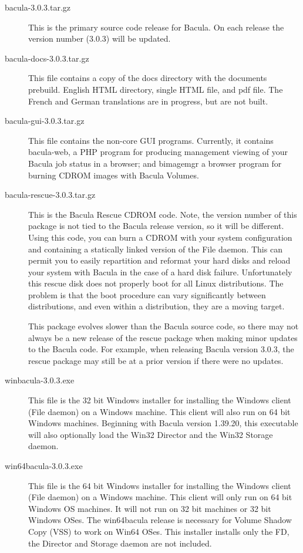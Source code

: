 \begin{description}
\item [bacula-3.0.3.tar.gz]
  This is the primary source code release for Bacula. On each
  release the version number (3.0.3) will be updated.

\item [bacula-docs-3.0.3.tar.gz]
  This file contains a copy of the docs directory with the
  documents prebuild. English HTML directory, single HTML
  file, and pdf file. The French and German translations
  are in progress, but are not built.

\item [bacula-gui-3.0.3.tar.gz]
  This file contains the non-core GUI programs. Currently,
  it contains bacula-web, a PHP program for producing management
  viewing of your Bacula job status in a browser; and bimagemgr
  a browser program for burning CDROM images with Bacula Volumes.

\item [bacula-rescue-3.0.3.tar.gz]
  This is the Bacula Rescue CDROM code. Note, the version number
  of this package is not tied to the Bacula release version, so
  it will be different.  Using this code, you can burn a CDROM
  with your system configuration and containing a statically
  linked version of the File daemon. This can permit you to easily
  repartition and reformat your hard disks and reload your
  system with Bacula in the case of a hard disk failure.
  Unfortunately this rescue disk does not properly boot for
  all Linux distributions. The problem is that the boot procedure
  can vary significantly between distributions, and even within
  a distribution, they are a moving target.

  This package evolves slower than the Bacula source code,
  so there may not always be a new release of the rescue package when
  making minor updates to the Bacula code. For example, when releasing
  Bacula version 3.0.3, the rescue package may still be at a prior
  version if there were no updates.

\item [winbacula-3.0.3.exe]
  This file is the 32 bit Windows installer for installing
  the Windows client (File daemon) on a Windows machine.
  This client will also run on 64 bit Windows machines.
  Beginning with Bacula version 1.39.20, this executable will
  also optionally load the Win32 Director and the Win32 
  Storage daemon.

\item [win64bacula-3.0.3.exe]
  This file is the 64 bit Windows installer for installing
  the Windows client (File daemon) on a Windows machine.
  This client will only run on 64 bit Windows OS machines.
  It will not run on 32 bit machines or 32 bit Windows OSes.
  The win64bacula release is necessary for Volume Shadow
  Copy (VSS) to work on Win64 OSes.  This installer
  installs only the FD, the Director and Storage daemon
  are not included.

\end{description}

